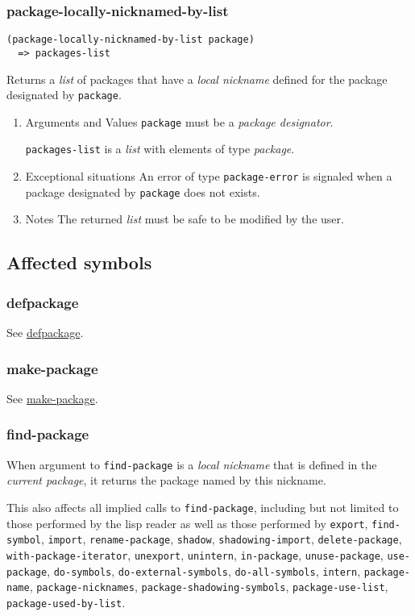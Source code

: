 \documentclass[11pt]{article}
\begin{document}
\subsubsection{package-locally-nicknamed-by-list}
\label{sec:org45f0e67}
\begin{verbatim}
(package-locally-nicknamed-by-list package)
  => packages-list
\end{verbatim}

Returns a \emph{list} of packages that have a \emph{local nickname} defined for the package
designated by \texttt{package}.
\begin{enumerate}
\item Arguments and Values
\label{sec:org89904ea}
\texttt{package} must be a \emph{package designator}.

\texttt{packages-list} is a \emph{list} with elements of type \emph{package}.
\item Exceptional situations
\label{sec:org25e3178}
An error of type \texttt{package-error} is signaled when a package designated by
\texttt{package} does not exists.
\item Notes
\label{sec:org4fe67bd}
The returned \emph{list} must be safe to be modified by the user.
\end{enumerate}
\subsection{Affected symbols}
\label{sec:orgaf51aa9}
\subsubsection{defpackage}
\label{sec:org186f780}
See \hyperref[sec:org2302211]{defpackage}.
\subsubsection{make-package}
\label{sec:org9ec1a24}
See \hyperref[sec:orgd9ef999]{make-package}.
\subsubsection{find-package}
\label{sec:orgaaf0775}
When argument to \texttt{find-package} is a \emph{local nickname} that is defined in the
\emph{current package}, it returns the package named by this nickname.

This also affects all implied calls to \texttt{find-package}, including but not limited
to those performed by the lisp reader as well as those performed by \texttt{export},
\texttt{find-symbol}, \texttt{import}, \texttt{rename-package}, \texttt{shadow}, \texttt{shadowing-import},
\texttt{delete-package}, \texttt{with-package-iterator}, \texttt{unexport}, \texttt{unintern}, \texttt{in-package},
\texttt{unuse-package}, \texttt{use-package}, \texttt{do-symbols}, \texttt{do-external-symbols},
\texttt{do-all-symbols}, \texttt{intern}, \texttt{package-name}, \texttt{package-nicknames},
\texttt{package-shadowing-symbols}, \texttt{package-use-list}, \texttt{package-used-by-list}.
\end{document}
